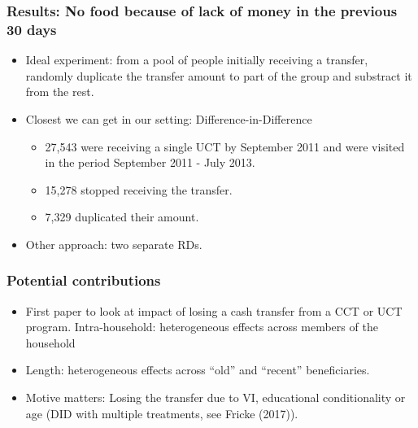 \documentclass{beamer}
\begin{document}
\begin{frame}
\frametitle{Results: No food because of lack of money in the previous 30 days}
\begin{itemize}
	\item Ideal experiment: from a pool of people initially receiving a transfer, randomly duplicate the transfer amount to part of the group and substract it from the rest.
	\item Closest we can get in our setting: Difference-in-Difference
	\begin{itemize}
		\item 27,543 were receiving a single UCT by September 2011 and were visited in the period September 2011 - July 2013.
		\item 15,278 stopped receiving the transfer.
		\item 7,329 duplicated their amount.
	\end{itemize}
	\item Other approach: two separate RDs.
\end{itemize}
\end{frame}

\begin{frame}
\frametitle{Potential contributions}
\begin{itemize}
	\item First paper to look at impact of losing a cash transfer from a CCT or UCT program.
	Intra-household: heterogeneous effects across members of the household 
	\item Length: heterogeneous effects across ``old'' and ``recent'' beneficiaries.
	\item Motive matters: Losing the transfer due to VI, educational conditionality or age (DID with multiple treatments, see Fricke (2017)).
\end{itemize}
\end{frame}
	
\end{document}
